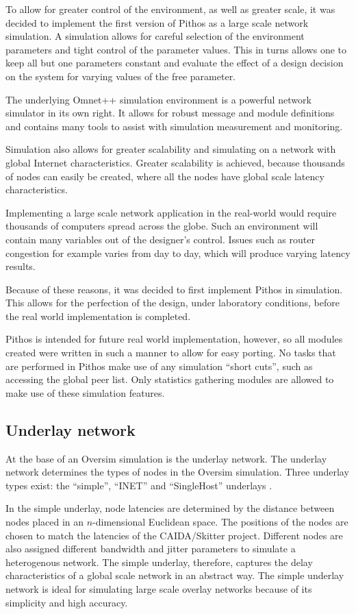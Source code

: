 To allow for greater control of the environment, as well as greater scale, it was decided to implement the first version of Pithos as a large scale network simulation. A simulation allows for careful selection of the environment parameters and tight control of the parameter values. This in turns allows one to keep all but one parameters constant and evaluate the effect of a design decision on the system for varying values of the free parameter.

The underlying Omnet++ simulation environment is a powerful network simulator in its own right. It allows for robust message and module definitions and contains many tools to assist with simulation measurement and monitoring.

Simulation also allows for greater scalability and simulating on a network with global Internet characteristics. Greater scalability is achieved, because thousands of nodes can easily be created, where all the nodes have global scale latency characteristics.

Implementing a large scale network application in the real-world would require thousands of computers spread across the globe. Such an environment will contain many variables out of the designer's control. Issues such as router congestion for example varies from day to day, which will produce varying latency results.

Because of these reasons, it was decided to first implement Pithos in simulation. This allows for the perfection of the design, under laboratory conditions, before the real world implementation is completed.

Pithos is intended for future real world implementation, however, so all modules created were written in such a manner to allow for easy porting. No tasks that are performed in Pithos make use of any simulation ``short cuts'', such as accessing the global peer list. Only statistics gathering modules are allowed to make use of these simulation features.


    \subsection{Underlay network}

At the base of an Oversim simulation is the underlay network. The underlay network determines the types of nodes in the Oversim simulation. Three underlay types exist: the ``simple'', ``INET'' and ``SingleHost'' underlays \cite{oversim_applications}.

In the simple underlay, node latencies are determined by the distance between nodes placed in an $n$-dimensional Euclidean space. The positions of the nodes are chosen to match the latencies of the CAIDA/Skitter project. Different nodes are also assigned different bandwidth and jitter parameters to simulate a heterogenous network. The simple underlay, therefore, captures the delay characteristics of a global scale network in an abstract way. The simple underlay network is ideal for simulating large scale overlay networks because of its simplicity and high accuracy.

